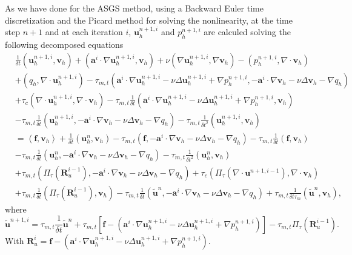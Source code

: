 As we have done for the ASGS method, using a Backward Euler time discretization and the Picard method for solving the nonlinearity, at the time step $ n+1 $ and at each iteration $ i $, $ \mathbf{u}_h^{n+1,i} $ and $ p_h^{n+1,i} $ are calculed solving the following decomposed equations
\begin{align}
\label{14}
&\frac{1}{\delta t}(\mathbf{u}_h^{n+1,i},\mathbf{v}_h)+(\mathbf{a}^i\cdot\nabla\mathbf{u}_h^{n+1,i},\mathbf{v}_h)+\nu(\nabla\mathbf{u}_h^{n+1,i},\nabla\mathbf{v}_h)-(p_h^{n+1,i},\nabla\cdot\mathbf{v}_h)\\\nonumber
&+(q_h,\nabla\cdot\mathbf{u}_h^{n+1,i})-\tau_{m,t}(\mathbf{a}^i\cdot\nabla\mathbf{u}_h^{n+1,i}-\nu\Delta\mathbf{u}_h^{n+1,i}+\nabla p_h^{n+1,i},-\mathbf{a}^i\cdot\nabla\mathbf{v}_h-\nu\Delta\mathbf{v}_h-\nabla q_h)\\\nonumber
&+\tau_c(\nabla\cdot\mathbf{u}_h^{n+1,i},\nabla\cdot\mathbf{v}_h)-\tau_{m,t}\frac{1}{\delta t}(\mathbf{a}^i\cdot\nabla\mathbf{u}_h^{n+1,i}-\nu\Delta\mathbf{u}_h^{n+1,i}+\nabla p_h^{n+1,i},\mathbf{v}_h)\\\nonumber
&-\tau_{m,t}\frac{1}{\delta t}(\mathbf{u}_h^{n+1,i},-\mathbf{a}^i\cdot\nabla\mathbf{v}_h-\nu\Delta\mathbf{v}_h-\nabla q_h)-\tau_{m,t}\frac{1}{\delta t^2}(\mathbf{u}_h^{n+1,i},\mathbf{v}_h)\\\nonumber
&=\left<\mathbf{f},\mathbf{v}_h\right>+\frac{1}{\delta t}(\mathbf{u}_h^n,\mathbf{v}_h)-\tau_{m,t}(\mathbf{f},-\mathbf{a}^i\cdot\nabla\mathbf{v}_h-\nu\Delta\mathbf{v}_h-\nabla q_h)-\tau_{m,t}\frac{1}{\delta t}(\mathbf{f},\mathbf{v}_h)\\\nonumber
&-\tau_{m,t}\frac{1}{\delta t}(\mathbf{u}_h^n,-\mathbf{a}^i\cdot\nabla\mathbf{v}_h-\nu\Delta\mathbf{v}_h-\nabla q_h)-\tau_{m,t}\frac{1}{\delta t^2}(\mathbf{u}_h^n,\mathbf{v}_h)\\\nonumber
&+\tau_{m,t}(\Pi_\tau(\mathbf{R}_u^{i-1}),-\mathbf{a}^i\cdot\nabla\mathbf{v}_h-\nu\Delta\mathbf{v}_h-\nabla q_h)+\tau_c(\Pi_\tau(\nabla\cdot\mathbf{u}^{n+1,i-1}),\nabla\cdot\mathbf{v}_h)\\\nonumber
&+\tau_{m,t}\frac{1}{\delta t}(\Pi_\tau(\mathbf{R}_u^{i-1}),\mathbf{v}_h)-\tau_{m,t}\frac{1}{\delta t}(\tilde{\mathbf{u}}^n,-\mathbf{a}^i\cdot\nabla\mathbf{v}_h-\nu\Delta\mathbf{v}_h-\nabla q_h)+\tau_{m,t}\frac{1}{\delta t\tau_m}(\tilde{\mathbf{u}}^n,\mathbf{v}_h),
\end{align}
where
\begin{equation}
\label{15}
\tilde{\mathbf{u}}^{n+1,i}=\tau_{m,t}\frac{1}{\delta t}\tilde{\mathbf{u}}^n+\tau_{m,t}\left[\mathbf{f}-(\mathbf{a}^i\cdot\nabla\mathbf{u}_h^{n+1,i}-\nu\Delta\mathbf{u}_h^{n+1,i}+\nabla p_h^{n+1,i})\right]-\tau_{m,t}\Pi_\tau(\mathbf{R}_u^{i-1}).
\end{equation}
With $ \mathbf{R}_u^i=\mathbf{f}-(\mathbf{a}^i\cdot\nabla\mathbf{u}_h^{n+1,i}-\nu\Delta\mathbf{u}_h^{n+1,i}+\nabla p_h^{n+1,i})$.

